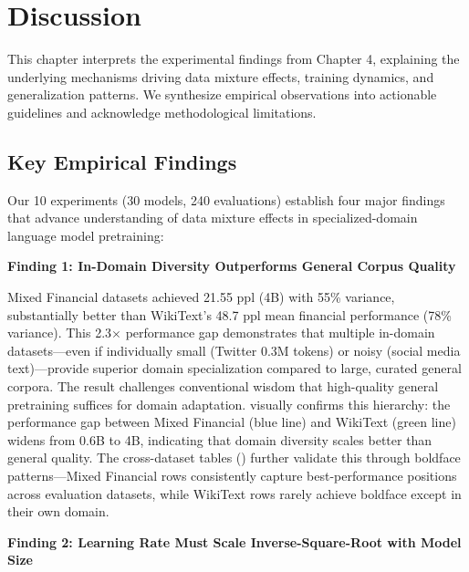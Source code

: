 \chapter{Discussion}

This chapter interprets the experimental findings from Chapter 4, explaining the underlying mechanisms driving data mixture effects, training dynamics, and generalization patterns. We synthesize empirical observations into actionable guidelines and acknowledge methodological limitations.

\section{Key Empirical Findings}

Our 10 experiments (30 models, 240 evaluations) establish four major findings that advance understanding of data mixture effects in specialized-domain language model pretraining:

\textbf{Finding 1: In-Domain Diversity Outperforms General Corpus Quality}

Mixed Financial datasets achieved 21.55 ppl (4B) with 55\% variance, substantially better than WikiText's 48.7 ppl mean financial performance (78\% variance). This 2.3$\times$ performance gap demonstrates that multiple in-domain datasets—even if individually small (Twitter 0.3M tokens) or noisy (social media text)—provide superior domain specialization compared to large, curated general corpora. The result challenges conventional wisdom that high-quality general pretraining suffices for domain adaptation.  visually confirms this hierarchy: the performance gap between Mixed Financial (blue line) and WikiText (green line) widens from 0.6B to 4B, indicating that domain diversity scales better than general quality. The cross-dataset tables () further validate this through boldface patterns—Mixed Financial rows consistently capture best-performance positions across evaluation datasets, while WikiText rows rarely achieve boldface except in their own domain.

\textbf{Finding 2: Learning Rate Must Scale Inverse-Square-Root with Model Size}

